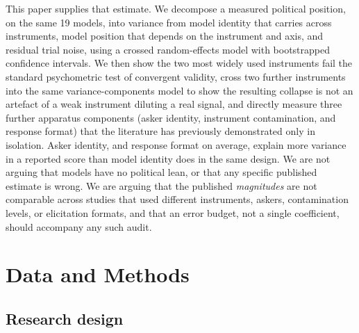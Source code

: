 \documentclass[12pt]{article}
\begin{document}
This paper supplies that estimate. We decompose a measured political
position, on the same 19 models, into variance from model identity that
carries across instruments, model position that depends on the instrument
and axis, and residual trial noise, using a crossed random-effects model
with bootstrapped confidence intervals. We then show the two most
widely used instruments fail the standard psychometric test of convergent
validity, cross two further instruments into the same variance-components
model to show the resulting collapse is not an artefact of a weak
instrument diluting a real signal, and directly measure three further
apparatus components (asker identity, instrument contamination, and
response format) that the literature has previously demonstrated only in
isolation. Asker identity, and response format on average, explain more
variance in a reported score than model identity does in the same design. We are not arguing that models have no political
lean, or that any specific published estimate is wrong. We are arguing that
the published \emph{magnitudes} are not comparable across studies that used
different instruments, askers, contamination levels, or elicitation
formats, and that an error budget, not a single coefficient, should
accompany any such audit.

\section{Data and Methods}

\subsection{Research design}
\label{sec:design}
\end{document}
